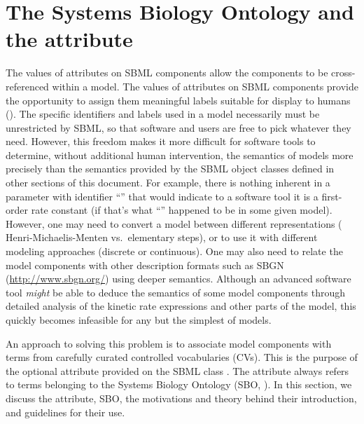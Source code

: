 
\section{The Systems Biology Ontology and the  attribute}
\label{sec:sboTerm}
\label{sec:sbo}

The values of  attributes on SBML components allow the
components to be cross-referenced within a model. The values of
 attributes on SBML components provide the opportunity
to assign them meaningful labels suitable for display to humans
().  The specific identifiers and
labels used in a model necessarily must be unrestricted by SBML,
so that software and users are free to pick whatever they need.
However, this freedom makes it more difficult for software tools
to determine, without additional human intervention, the semantics
of models more precisely than the semantics provided by the SBML
object classes defined in other sections of this document.  For
example, there is nothing inherent in a parameter with identifier
``'' that would indicate to a software tool it is a
first-order rate constant (if that's what ``'' happened
to be in some given model).  However, one may need to convert a
model between different representations (\eg
Henri-Michaelis-Menten vs.\ elementary steps), or to use it with
different modeling approaches (discrete or continuous).  One may
also need to relate the model components with other description
formats such as SBGN (\url{http://www.sbgn.org/}) using deeper
semantics.  Although an advanced software tool \emph{might} be
able to deduce the semantics of some model components through
detailed analysis of the kinetic rate expressions and other parts
of the model, this quickly becomes infeasible for any but the
simplest of models.

An approach to solving this problem is to associate model
components with terms from carefully curated controlled
vocabularies (CVs).  This is the purpose of the optional
 attribute provided on the SBML
class \SBase.  The  attribute always refers to
terms belonging to the Systems Biology Ontology (SBO, \citep{courtot:2011}). In
this section, we discuss the  attribute,
SBO, the motivations and theory behind their introduction, and
guidelines for their use.


